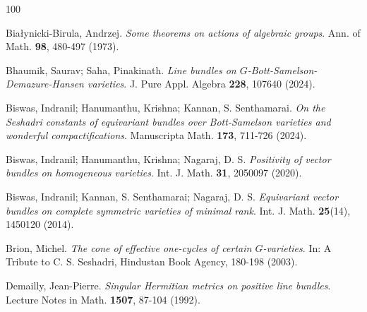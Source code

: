 \documentclass[11pt,reqno,a4paper]{amsart}
\theoremstyle{remark}
\begin{document}

\begin{thebibliography}{100}


 Białynicki-Birula, Andrzej. {\it Some theorems on actions of algebraic groups}. Ann. of Math. \textbf{98}, 480-497 (1973).



 Bhaumik, Saurav; Saha, Pinakinath. {\it Line bundles on $G$-Bott-Samelson-Demazure-Hansen varieties}. J. Pure Appl. Algebra \textbf{228}, 107640 (2024).

 Biswas, Indranil; Hanumanthu, Krishna; Kannan, S. Senthamarai. {\it On the Seshadri constants of equivariant bundles over Bott-Samelson varieties and wonderful compactifications}. Manuscripta Math. \textbf{173}, 711-726 (2024).



 Biswas, Indranil; Hanumanthu, Krishna; Nagaraj, D. S. {\it Positivity of vector bundles on homogeneous varieties}. Int. J. Math. \textbf{31}, 2050097 (2020).

 Biswas, Indranil; Kannan, S. Senthamarai; Nagaraj, D. S. {\it Equivariant vector bundles on complete symmetric varieties of minimal rank}. Int. J. Math. \textbf{25}(14), 1450120 (2014).

 Brion, Michel. {\it The cone of effective one-cycles of certain $G$-varieties}. In: A Tribute to C. S. Seshadri, Hindustan Book Agency, 180-198 (2003).

 Demailly, Jean-Pierre. {\it Singular Hermitian metrics on positive line bundles}. Lecture Notes in Math. \textbf{1507}, 87-104 (1992).


\end{thebibliography}
\end{document}
